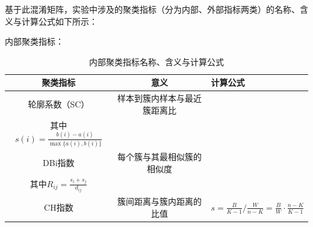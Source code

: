 \documentclass {article}
\begin{document}
	基于此混淆矩阵，实验中涉及的聚类指标（分为内部、外部指标两类）的名称、含义与计算公式如下所示：
	
	内部聚类指标：
	\begin{table}[H]
		\centering
		\caption{内部聚类指标名称、含义与计算公式}
		\begin{tabular}{ccl}
			\hline
			聚类指标 & 意义 & 计算公式 \\
			\hline
			轮廓系数（SC） & 样本到簇内样本与最近簇距离比 & \makecell{$s=\frac{1}{n} \sum_{i=1}^n s(i)$，\\ 其中$s(i)=\frac{b(i)-a(i)}{\max \{a(i), b(i)\}}$} \\
			DBi指数 & 每个簇与其最相似簇的相似度 & \makecell{$D B=\frac{1}{K} \sum_{i, j=1}^K \max _{i \neq j} R_{i j}$，\\ 其中$R_{i j}=\frac{s_i+s_j}{d_{i j}}$} \\
			CH指数 & 簇间距离与簇内距离的比值 & $s=\frac{B}{K-1} / \frac{W}{n-K}=\frac{B}{W} \cdot \frac{n-K}{K-1}$ \\
			\hline 	                                                                                         
		\end{tabular}
	\end{table}
	
\end{document}
